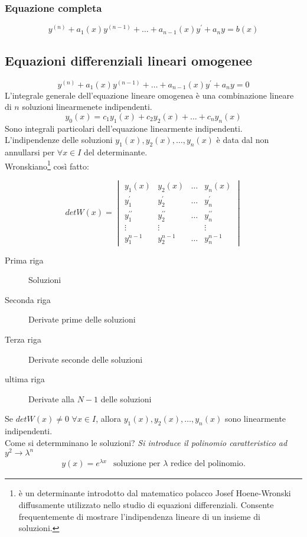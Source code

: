 \subsubsection{Equazione completa}
\begin{equation}
  y^{(n)}+a_1(x)y^{(n-1)}+\dots+a_{n-1}(x)y^{\prime}+a_ny=b(x)
\end{equation}
\clearpage
\subsection{Equazioni differenziali lineari omogenee}
\begin{equation}
  y^{(n)}+a_1(x)y^{(n-1)}+\dots+a_{n-1}(x)y^{\prime}+a_ny=0
\end{equation}
L'integrale generale dell'equazione lineare omogenea è una combinazione lineare di $n$
soluzioni linearmenete indipendenti.
\begin{equation}
  y_0 (x)=c_1y_1(x)+c_2y_2(x)+\dots+c_ny_n(x)
\end{equation}
Sono integrali particolari dell'equazione linearmente indipendenti.\\
L'indipendenze delle soluzioni $y_1(x),y_2(x),\dots,y_n(x)$ è data dal non annullarsi per
$\forall x\in I$ del determinante.\\
{\color{red}Wronskiano}\footnote{è un determinante introdotto dal matematico 
polacco Josef Hoene-Wronski diffusamente utilizzato nello studio di equazioni
differenziali. Consente frequentemente di mostrare l'indipendenza lineare di 
un insieme di soluzioni.} così fatto:
\begin{multicols}{2}
\begin{equation*}
  det W(x)=\begin{vmatrix}
             y_1(x) & y_2(x) & \dots & y_n(x) \\
             y_1^{\prime} & y_2^{\prime} &\dots& y_n^{\prime}\\
             y_1^{\prime\prime} & y_2^{\prime\prime} & \dots & y_n^{\prime\prime}\\
             \vdots & \vdots && \vdots\\ 
             y_1^{n-1} & y_2^{n-1} & \dots & y_n^{n-1}
           \end{vmatrix}
\end{equation*}
\begin{description}
    \item[Prima riga] Soluzioni
    \item[Seconda riga] Derivate prime delle soluzioni
    \item[Terza riga] Derivate seconde delle soluzioni
    \item[ultima riga] Derivate alla $N-1$ delle soluzioni
\end{description}
\end{multicols}    
Se $det W(x)\neq 0$ $\forall x\in I$, allora $y_1(x),y_2(x),\dots,y_n(x)$ sono linearmente
indipendenti.\\
Come si determminano le soluzioni? \emph{Si introduce il polinomio caratteristico ad }
$y^2 \to \lambda^{n}$ 
\begin{eqnarray*}
y(x)=e^{\lambda x} & \text{soluzione per $\lambda$ redice del polinomio}.
\end{eqnarray*}
